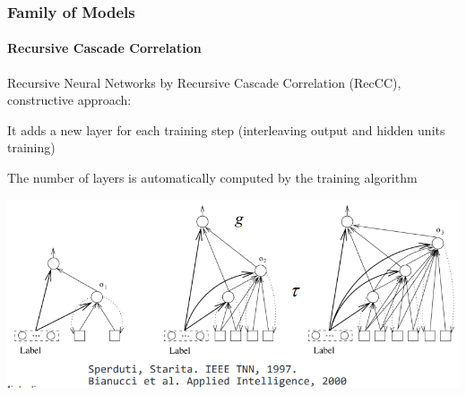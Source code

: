 \documentclass[10pt]{report}
\begin{document}
\subsubsection{Family of Models}
\paragraph{Recursive Cascade Correlation} Recursive Neural Networks by Recursive Cascade Correlation (RecCC), constructive approach:
\begin{list}{}{}
	\item It adds a new layer for each training step (interleaving output and hidden units training)
	\item The number of layers is automatically computed by the training algorithm
\end{list}
\begin{center}
	\includegraphics[scale=0.5]{44.png}
\end{center}
\end{document}
